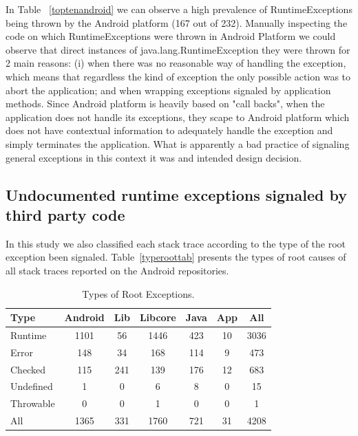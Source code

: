 \documentclass[conference]{IEEEtran}
\begin{document}
In Table ~\ref{toptenandroid} we can observe a high prevalence of RuntimeExceptions being thrown by the Android platform (167 out of 232).  Manually inspecting the code on which RuntimeExceptions were thrown in Android Platform we could observe that direct instances of java.lang.RuntimeException they were thrown for 2 main reasons: (i) when there was no reasonable way of handling the exception, which means that regardless the kind of exception the only possible action was to abort the application; and when wrapping exceptions signaled by application methods. Since Android platform is heavily based on "call backs", when the application does not handle its exceptions, they scape to Android platform which does not have contextual information to adequately handle the exception and simply terminates the application. What is apparently a bad practice of signaling general exceptions in this context it was and intended design decision.




\subsection{Undocumented runtime exceptions signaled by third party code}

In this study we also classified each stack trace according to the type of the root exception been signaled. Table~\ref{typeroottab} presents the types of root causes of all stack traces reported on the Android repositories. 

\begin{table}
\centering
\begin{tabular}{lcccccc}
    \hline
    \bfseries{Type} & \bfseries{Android} & \bfseries{Lib} & \bfseries{Libcore} & \bfseries{Java} & \bfseries{App} & \bfseries{All}\\
    \hline

Runtime	&	1101	&	56	&	1446	&	423	&	10	&	3036	\\
Error	&	148	&	34	&	168	&	114	&	9	&	473	\\
Checked	&	115	&	241	&	139	&	176	&	12	&	683	\\
Undefined	&	1	&	0	&	6	&	8	&	0	&	15	\\
Throwable	&	0	&	0	&	1	&	0	&	0	&	1	\\

    \hline
 All  &	1365	&	331	&	1760	&	721	&	31	&	4208	\\
    \hline
  \end{tabular}
\caption{Types of Root Exceptions.}
  \label{fig:typeroottab}
\end{table}
\end{document}
